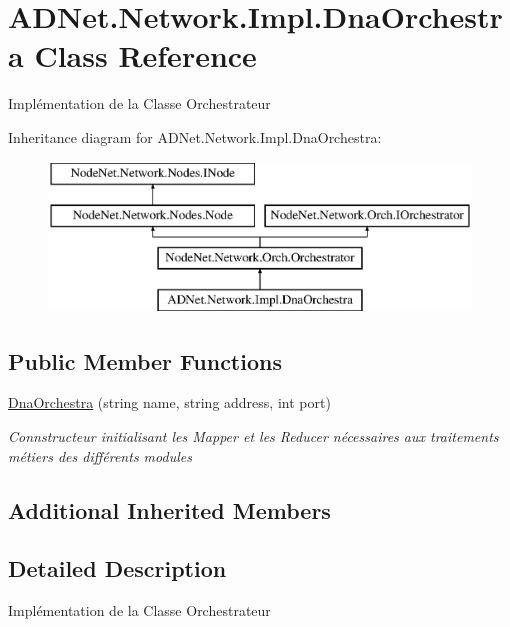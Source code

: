 \hypertarget{class_a_d_net_1_1_network_1_1_impl_1_1_dna_orchestra}{}\section{A\+D\+Net.\+Network.\+Impl.\+Dna\+Orchestra Class Reference}
\label{class_a_d_net_1_1_network_1_1_impl_1_1_dna_orchestra}


Implémentation de la Classe Orchestrateur  


Inheritance diagram for A\+D\+Net.\+Network.\+Impl.\+Dna\+Orchestra\+:\begin{figure}[H]
\begin{center}
\leavevmode
\includegraphics[height=4.000000cm]{class_a_d_net_1_1_network_1_1_impl_1_1_dna_orchestra}
\end{center}
\end{figure}
\subsection*{Public Member Functions}
\begin{DoxyCompactItemize}
\item 
\hyperlink{class_a_d_net_1_1_network_1_1_impl_1_1_dna_orchestra_aa7e3b7291bb46e969f3ca0a2e979aa9a}{Dna\+Orchestra} (string name, string address, int port)
\begin{DoxyCompactList}\small\item\em Connstructeur initialisant les Mapper et les Reducer nécessaires aux traitements métiers des différents modules \end{DoxyCompactList}\end{DoxyCompactItemize}
\subsection*{Additional Inherited Members}


\subsection{Detailed Description}
Implémentation de la Classe Orchestrateur 



